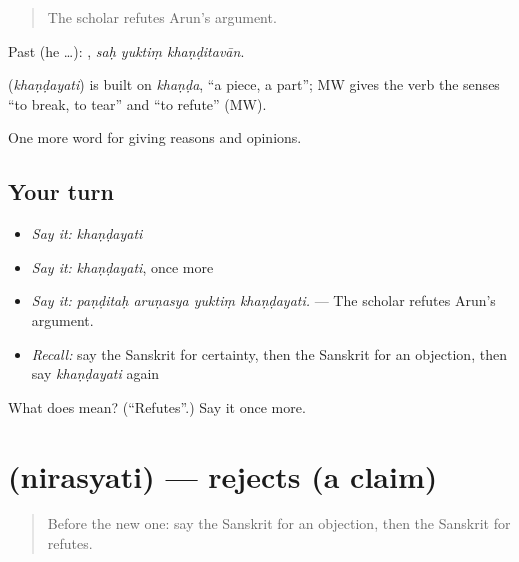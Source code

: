 \begin{quote}
The scholar refutes Arun's argument.
\end{quote}

Past (he …):   , \emph{saḥ yuktiṃ khaṇḍitavān}.

\begin{cousinweb}
\textbf{} (\emph{khaṇḍayati}) is built on \emph{khaṇḍa}, \textquotedblleft{}a piece, a part\textquotedblright{}; MW gives the verb the senses \textquotedblleft{}to break, to tear\textquotedblright{} and \textquotedblleft{}to refute\textquotedblright{} (MW).
\end{cousinweb}

\begin{grammarlens}[title={What you've built}]
One more word for giving reasons and opinions.
\end{grammarlens}

\subsection*{Your turn}
\begin{itemize}
\raggedright
  \item \emph{Say it:} \emph{khaṇḍayati}
  \item \emph{Say it:} \emph{khaṇḍayati}, once more
  \item \emph{Say it:} \emph{paṇḍitaḥ aruṇasya yuktiṃ khaṇḍayati.} — The scholar refutes Arun's argument.
  \item \emph{Recall:} say the Sanskrit for certainty, then the Sanskrit for an objection, then say \emph{khaṇḍayati} again
\end{itemize}

\begin{tcolorbox}[breakable,colback=teal!4,colframe=teal!35!black,title={Before you move on}]
What does  mean? (\textquotedblleft{}Refutes\textquotedblright{}.) Say it once more.
\end{tcolorbox}
\section[\texorpdfstring{\sk{निरस्यति} (nirasyati)}{निरस्यति (nirasyati)}]{ (nirasyati) — rejects (a claim)}

\label{lesson:SA-C346-nirasyati}



\begin{quote}
Before the new one: say the Sanskrit for an objection, then the Sanskrit for refutes.
\end{quote}

